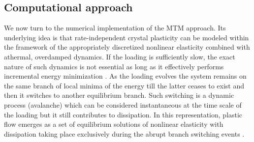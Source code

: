 \documentclass[CRPHYS,Unicode,manuscript]{cedram}
\begin{document}
\subsection{Computational approach}

We now turn to the numerical implementation of the MTM approach. Its underlying  idea  is that   rate-independent crystal  plasticity  can be  modeled within the framework of  the appropriately discretized  nonlinear elasticity    combined with   athermal,  overdamped  dynamics.  If the loading is sufficiently slow, the exact nature of such  dynamics is not essential  as long as it  effectively performs incremental energy minimization \cite{Puglisi2005-lg,Mielke2011-ck}.  As the loading evolves the system remains on the same branch of local minima of the energy till the latter ceases to exist and then it switches to another equilibrium branch. Such switching is a dynamic process (avalanche) which can be considered instantaneous at the time scale of the loading but it still contributes to  dissipation. In this representation,   plastic flow  emerges as  a  set of equilibrium solutions of  nonlinear  elasticity with dissipation taking place exclusively during the  abrupt  branch switching events \cite{Puglisi2005-lg}. 
\end{document}
